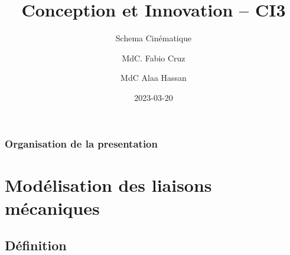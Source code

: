 \documentclass[
  ignorenonframetext,
  aspectratio=169,
  c]{beamer}
\title{Conception et Innovation -- CI3}
\subtitle{Schema Cinématique}
\author{MdC. Fabio Cruz \and MdC Alaa Hassan}
\date{2023-03-20}
\institute{Université de Lorraine \textbar{} ENSGSI}
\renewcommand*\contentsname{Table of contents}
\newcommand\contentsname{Table of contents}
\begin{document}
\frame{\titlepage}

\renewcommand*\contentsname{Organisation de la presentation}
\begin{frame}[allowframebreaks]
  \frametitle{Organisation de la presentation}
  \tableofcontents[hideallsubsections]
\end{frame}
\section{Modélisation des liaisons
mécaniques}\label{moduxe9lisation-des-liaisons-muxe9caniques}

\subsection{Définition}\label{duxe9finition}
\end{document}

